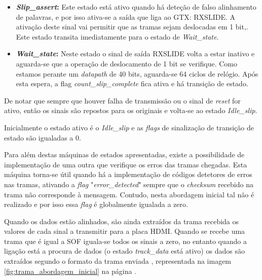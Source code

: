 \begin{enumerate}
\begin{itemize}
		\item \textbf{\textit{Slip\_assert}:} Este estado está ativo quando há deteção de falso alinhamento de palavras, e por isso ativa-se a saída que liga ao GTX: RXSLIDE. A ativação deste sinal vai permitir que as tramas sejam deslocadas em 1 bit,. Este estado transita imediatamente para o estado de \textit{Wait\_state}.
		
		\item \textbf{\textit{Wait\_state}:} Neste estado o sinal de saída RXSLIDE volta a estar inativo e aguarda-se que a operação de deslocamento de 1 bit se verifique. Como estamos perante um \textit{datapath} de 40 bits, aguarda-se 64 ciclos de relógio. Após esta espera, a flag \textit{count\_slip\_complete} fica ativa e há transição de estado.
	\end{itemize}
	
	De notar que sempre que houver falha de transmissão ou o sinal de \textit{reset} for ativo, então os sinais são repostos para os originais e volta-se ao estado \textit{Idle\_slip}.
	
	
	Inicialmente o estado ativo é o {\textit{Idle\_slip} }e as \textit{flags} de sinalização de transição de estado são igualadas a 0.
	
\end{enumerate}

Para além destas máquinas de estados apresentadas, existe a possibilidade de implementação de uma outra que verifique os erros das tramas chegadas. Esta máquina torna-se útil quando há a implementação de códigos detetores de erros nas tramas, ativando a \textit{flag}  "\textit{error\_detected}" sempre que o \textit{checksum} recebido na trama não corresponde à mensagem. Contudo, nesta abordagem inicial tal não é realizado e por isso essa \textit{flag} é globalmente igualada a zero.

Quando os dados estão alinhados, são ainda extraídos da trama recebida os valores de cada sinal a transmitir para a placa HDMI. Quando se recebe uma trama que é igual a SOF iguala-se todos os sinais a zero, no entanto quando a ligação está a procura de dados (o estado \textit{track\_data} está ativo) os dados são extraídos segundo o formato da trama enviada , representada na imagem \ref{fig:trama_abordagem_inicial} na página \pageref{fig:trama_abordagem_inicial}.

